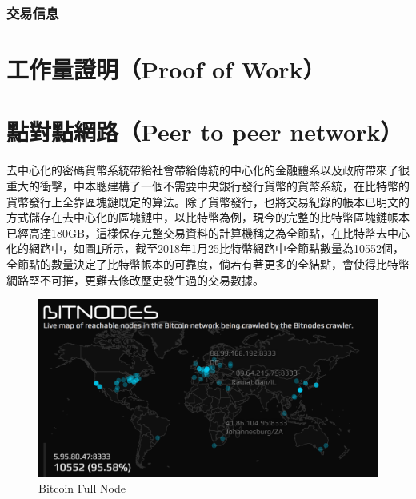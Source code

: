			\subsubsection{交易信息}

	\section{工作量證明（Proof of Work）}
	\section{點對點網路（Peer to peer network）}

	去中心化的密碼貨幣系統帶給社會帶給傳統的中心化的金融體系以及政府帶來了很重大的衝擊，中本聰建構了一個不需要中央銀行發行貨幣的貨幣系統，在比特幣的貨幣發行上全靠區塊鏈既定的算法。除了貨幣發行，也將交易紀錄的帳本已明文的方式儲存在去中心化的區塊鏈中，以比特幣為例，現今的完整的比特幣區塊鏈帳本已經高達180GB，這樣保存完整交易資料的計算機稱之為全節點，在比特幣去中心化的網路中，如圖\ref{bitcoinfullnode}所示，截至2018年1月25比特幣網路中全節點數量為10552個\supercite{bitcoinfullnode}，全節點的數量決定了比特幣帳本的可靠度，倘若有著更多的全結點，會使得比特幣網路堅不可摧，更難去修改歷史發生過的交易數據。

	\begin{figure}
		\centering
		\includegraphics[width = .9\textwidth]{bitcoinfullnode.png}
		\caption{Bitcoin Full Node\supercite{bitcoinfullnode}}\label{bitcoinfullnode}
	\end{figure}






